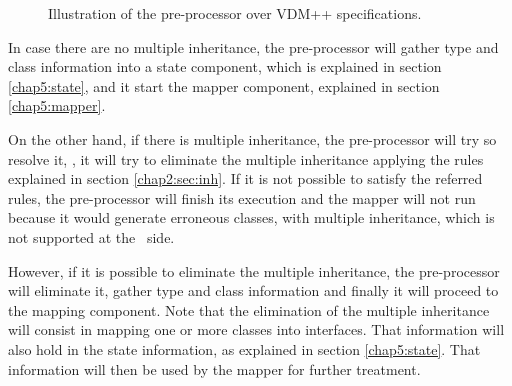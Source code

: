 \begin{figure}[!htb]
\begin{center}
\end{center}
\caption{Illustration of the pre-processor over VDM++ specifications.}
\label{chap5:figure:pre}
\end{figure}

In case there are no multiple inheritance, the pre-processor will gather type and class information into a state component, which is explained in section \ref{chap5:state}, and it start the mapper component, explained in section \ref{chap5:mapper}. 

On the other hand, if there is multiple inheritance, the pre-processor will try so resolve it, \ie, it will try to eliminate the multiple inheritance applying the rules explained in section \ref{chap2:sec:inh}. If it is not possible to satisfy the referred rules, the pre-processor will finish its execution and the mapper will not run because it would generate erroneous classes, with multiple inheritance, which is not supported at the \jml\ side. 

However, if it is possible to eliminate the multiple inheritance, the pre-processor will eliminate it, gather type and class information and finally it will proceed to the mapping component. Note that the elimination of the multiple inheritance will consist in mapping one or more classes into interfaces. That information will also hold in the state information, as explained in section \ref{chap5:state}. That information will then be used by the mapper for further treatment.

